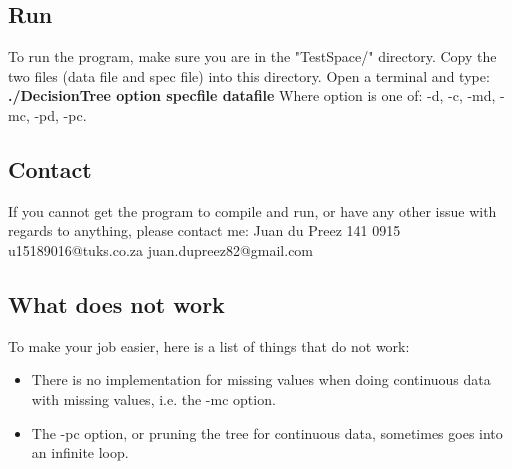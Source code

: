 \documentclass[a4paper]{article}
\begin{document}
	\subsection{Run}
	To run the program, make sure you are in the "TestSpace/" directory. Copy the two files (data file and spec file) into 			this directory. Open a terminal and type: \newline
	\newline	
	\textbf{./DecisionTree  option specfile datafile}
	\newline	
	\newline
	Where option is one of: -d, -c, -md, -mc, -pd, -pc.
	
	
	\subsection{Contact}
	If you cannot get the program to compile and run, or have any other issue with regards to anything, please contact me: \newline
	Juan du Preez 141 0915\newline
	u15189016@tuks.co.za\newline
	juan.dupreez82@gmail.com
	
	\subsection{What does not work}
	To make your job easier, here is a list of things that do not work: \newline
	\begin{itemize}
	\item There is no implementation for missing values when doing continuous data with missing values, i.e. the -mc option.
	\item The -pc option, or pruning the tree for continuous data, sometimes goes into an infinite loop. 
	\end{itemize}
	
	
\end{document}
